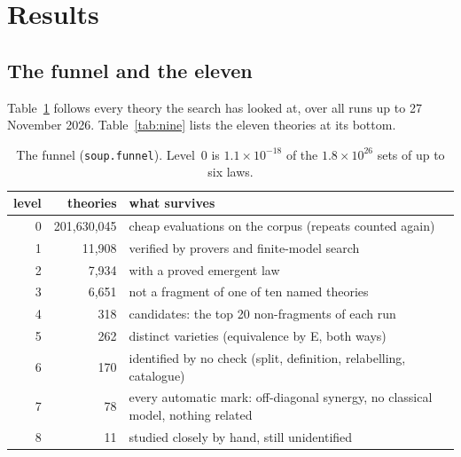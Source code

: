 \documentclass[11pt]{article}
\begin{document}
\section{Results}

\subsection{The funnel and the eleven}
Table~\ref{tab:funnel} follows every theory the search has looked at, over all runs up to 27 November 2026.
Table~\ref{tab:nine} lists the eleven theories at its bottom.

\begin{table}[!htb]\centering\small
\begin{tabular}{rrl}\toprule
level & theories & what survives \\\midrule
0 & 201{,}630{,}045 & cheap evaluations on the corpus (repeats counted again) \\
1 & 11{,}908 & verified by provers and finite-model search \\
2 & 7{,}934 & with a proved emergent law \\
3 & 6{,}651 & not a fragment of one of ten named theories \\
4 & 318 & candidates: the top 20 non-fragments of each run \\
5 & 262 & distinct varieties (equivalence by E, both ways) \\
6 & 170 & identified by no check (split, definition, relabelling, catalogue) \\
7 & 78 & every automatic mark: off-diagonal synergy, no classical model, nothing related \\
8 & 11 & studied closely by hand, still unidentified \\\bottomrule
\end{tabular}
\caption{The funnel (\texttt{soup.funnel}). Level~0 is $1.1\times10^{-18}$ of the $1.8\times10^{26}$ sets of up to
six laws.}\label{tab:funnel}
\end{table}
\end{document}
